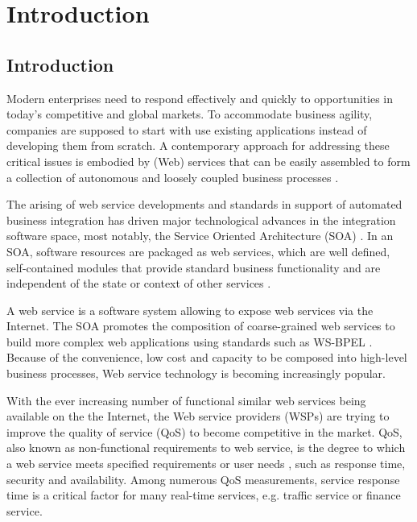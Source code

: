 

\chapter{Introduction}\label{C:intro}
\section{Introduction}
Modern enterprises need to respond effectively and quickly to opportunities in today's competitive and global markets. 
To accommodate business agility, companies are supposed to start with use existing applications instead of
developing them from scratch. 
A contemporary approach for addressing these critical issues is embodied by (Web) services that can be 
easily assembled to form a collection of autonomous and loosely coupled business processes \cite{Papazoglou}.

The arising of web service developments and standards in support of automated business integration has 
driven major technological advances in the integration software space, most notably, 
the Service Oriented Architecture (SOA) \cite{Dan:2008}. In an SOA, software resources are packaged as 
web services, which are well defined, self-contained modules that provide standard business functionality
and are independent of the state or context of other services \cite{Ran}.

A web service is a software system allowing to expose web services via the Internet. The 
SOA promotes the composition of coarse-grained web services to build more complex
web applications using standards such as WS-BPEL \cite{std/ws-bpel2}. Because of the convenience, 
low cost and capacity \cite{Aboolian} to be composed into high-level business processes, Web service technology is becoming increasingly popular.


With the ever increasing number of functional similar web services being available on the the Internet, the Web service providers (WSPs) are trying to improve the quality of service (QoS) to become competitive in the market.  
QoS, also known as non-functional requirements to  web service, is the degree to which a web service meets specified requirements or user needs \cite{4061431}, such as response time, security and availability. 
Among numerous QoS measurements, service response time is a critical factor for many real-time services, e.g. traffic service or finance service. 


